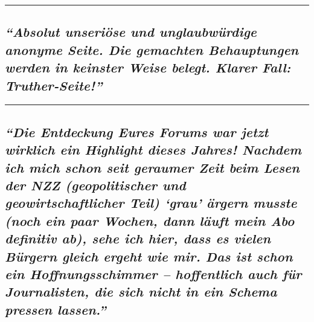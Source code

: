 \begin{center}\rule{0.5\linewidth}{\linethickness}\end{center}

\hypertarget{absolut-unseriuxf6se-und-unglaubwuxfcrdige-anonyme-seite-die-gemachten-behauptungen-werden-in-keinster-weise-belegt-klarer-fall-truther-seite}{%
\subsection{\texorpdfstring{\emph{``Absolut unseriöse und unglaubwürdige
anonyme Seite. Die gemachten Behauptungen werden in keinster Weise
belegt. Klarer Fall:
Truther-Seite!''}}{``Absolut unseriöse und unglaubwürdige anonyme Seite. Die gemachten Behauptungen werden in keinster Weise belegt. Klarer Fall: Truther-Seite!''}}\label{absolut-unseriuxf6se-und-unglaubwuxfcrdige-anonyme-seite-die-gemachten-behauptungen-werden-in-keinster-weise-belegt-klarer-fall-truther-seite}}

\begin{center}\rule{0.5\linewidth}{\linethickness}\end{center}

\hypertarget{die-entdeckung-eures-forums-war-jetzt-wirklich-ein-highlight-dieses-jahres-nachdem-ich-mich-schon-seit-geraumer-zeit-beim-lesen-der-nzz-geopolitischer-und-geowirtschaftlicher-teil-grau-uxe4rgern-musste-noch-ein-paar-wochen-dann-luxe4uft-mein-abo-definitiv-ab-sehe-ich-hier-dass-es-vielen-buxfcrgern-gleich-ergeht-wie-mir-das-ist-schon-ein-hoffnungsschimmer--hoffentlich-auch-fuxfcr-journalisten-die-sich-nicht-in-ein-schema-pressen-lassen}{%
\subsection{\texorpdfstring{\emph{``Die Entdeckung Eures Forums war
jetzt wirklich ein Highlight dieses Jahres! Nachdem ich mich schon seit
geraumer Zeit beim Lesen der NZZ (geopolitischer und geowirtschaftlicher
Teil) `grau' ärgern musste (noch ein paar Wochen, dann läuft mein Abo
definitiv ab), sehe ich hier, dass es vielen Bürgern gleich ergeht wie
mir. Das ist schon ein Hoffnungsschimmer -- hoffentlich auch für
Journalisten, die sich nicht in ein Schema pressen
lassen.''}}{``Die Entdeckung Eures Forums war jetzt wirklich ein Highlight dieses Jahres! Nachdem ich mich schon seit geraumer Zeit beim Lesen der NZZ (geopolitischer und geowirtschaftlicher Teil) `grau' ärgern musste (noch ein paar Wochen, dann läuft mein Abo definitiv ab), sehe ich hier, dass es vielen Bürgern gleich ergeht wie mir. Das ist schon ein Hoffnungsschimmer -- hoffentlich auch für Journalisten, die sich nicht in ein Schema pressen lassen.''}}\label{die-entdeckung-eures-forums-war-jetzt-wirklich-ein-highlight-dieses-jahres-nachdem-ich-mich-schon-seit-geraumer-zeit-beim-lesen-der-nzz-geopolitischer-und-geowirtschaftlicher-teil-grau-uxe4rgern-musste-noch-ein-paar-wochen-dann-luxe4uft-mein-abo-definitiv-ab-sehe-ich-hier-dass-es-vielen-buxfcrgern-gleich-ergeht-wie-mir-das-ist-schon-ein-hoffnungsschimmer--hoffentlich-auch-fuxfcr-journalisten-die-sich-nicht-in-ein-schema-pressen-lassen}}

